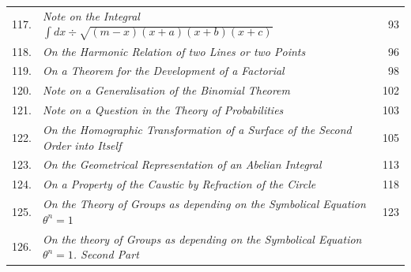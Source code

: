 \documentclass[11pt]{article}
\begin{document}
\begin{longtable}{@{}r p{} r@{}}
117. & \emph{Note on the Integral $\int dx \div \sqrt{(m-x)(x+a)(x+b)(x+c)}$} \dotfill \par
\hspace{1em}{\footnotesize Phil.\ Mag.\ t.\ vi.\ (1853), pp.\ 103---105} & 93 \\
118. & \emph{On the Harmonic Relation of two Lines or two Points} \dotfill \par
\hspace{1em}{\footnotesize Phil.\ Mag.\ t.\ vi.\ (1853), pp.\ 105---107} & 96 \\
119. & \emph{On a Theorem for the Development of a Factorial} \dotfill \par
\hspace{1em}{\footnotesize Phil.\ Mag.\ t.\ vi.\ (1853), pp.\ 182---185} & 98 \\
120. & \emph{Note on a Generalisation of the Binomial Theorem} \dotfill \par
\hspace{1em}{\footnotesize Phil.\ Mag.\ t.\ vi.\ (1853), p.\ 185} & 102 \\
121. & \emph{Note on a Question in the Theory of Probabilities} \dotfill \par
\hspace{1em}{\footnotesize Phil.\ Mag.\ t.\ vi.\ (1853), p.\ 259} & 103 \\
122. & \emph{On the Homographic Transformation of a Surface of the Second Order into Itself} \dotfill \par
\hspace{1em}{\footnotesize Phil.\ Mag.\ t.\ vi.\ (1853), pp.\ 326---333} & 105 \\
123. & \emph{On the Geometrical Representation of an Abelian Integral} \dotfill \par
\hspace{1em}{\footnotesize Phil.\ Mag.\ t.\ vi.\ (1853), pp.\ 414---418} & 113 \\
124. & \emph{On a Property of the Caustic by Refraction of the Circle} \dotfill \par
\hspace{1em}{\footnotesize Phil.\ Mag.\ t.\ vi.\ (1853), pp.\ 427---431} & 118 \\
125. & \emph{On the Theory of Groups as depending on the Symbolical Equation $\theta^n=1$} \dotfill \par
\hspace{1em}{\footnotesize Phil.\ Mag.\ t.\ vii.\ (1854), pp.\ 40---47} & 123 \\
126. & \emph{On the theory of Groups as depending on the Symbolical Equation $\theta^n=1$. Second Part} \dotfill \par

\end{longtable}
\end{document}
